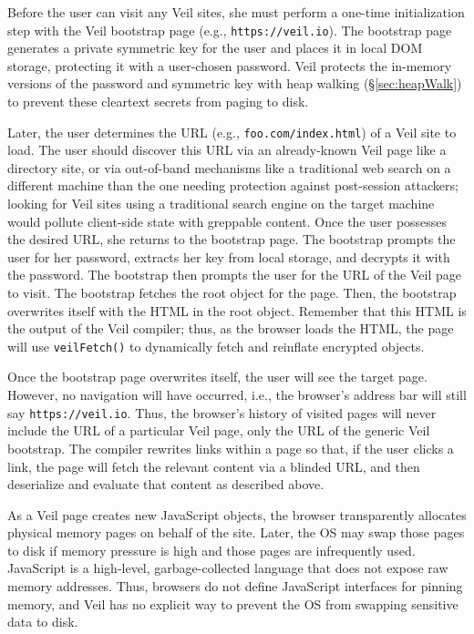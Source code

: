 \label{sec:bootstrap}
Before the user can visit any Veil sites, she
must perform a one-time initialization step
with the Veil bootstrap page (e.g., \texttt{https://veil.io}).
The bootstrap page generates a private symmetric key for
the user and places it in local DOM storage,
protecting it with a user-chosen password. Veil
protects the in-memory versions of the password and
symmetric key with heap walking (\S\ref{sec:heapWalk})
to prevent these cleartext secrets from paging to disk.

Later, the user determines the URL (e.g., \texttt{foo.com/index.html})
of a Veil site to load. The user should discover
this URL via an already-known Veil page like a
directory site, or via out-of-band mechanisms like a
traditional web search on a different machine than the
one needing protection against post-session attackers; looking
for Veil sites using a traditional search engine
on the target machine would pollute client-side state
with greppable content. Once the user possesses the
desired URL, she returns to the bootstrap page. The
bootstrap prompts the user for her password, extracts
her key from local storage, and decrypts it with the
password. The bootstrap then prompts the user for
the URL of the Veil page to visit. The bootstrap
fetches the root object for the page. Then, the
bootstrap overwrites itself with the HTML in the
root object. Remember that this HTML is the output
of the Veil compiler; thus, as the browser loads
the HTML, the page will use \texttt{veilFetch()}
to dynamically fetch and reinflate encrypted objects.

Once the bootstrap page overwrites itself, the user
will see the target page. However, no navigation will
have occurred, i.e., the browser's address bar will
still say \texttt{https://veil.io}. Thus,
the browser's history of visited pages will
never include the URL of a particular Veil page,
only the URL of the generic Veil bootstrap. The
compiler rewrites links within a page so that, if
the user clicks a link, the page will fetch the
relevant content via a blinded URL, and then deserialize
and evaluate that content as described above.

\label{sec:heapWalk}

As a Veil page creates new JavaScript objects,
the browser transparently allocates physical
memory pages on behalf of the site. Later,
the OS may swap those pages to disk if memory
pressure is high and those pages are infrequently
used. JavaScript is a high-level, garbage-collected
language that does not expose raw memory addresses.
Thus, browsers do not define JavaScript interfaces
for pinning memory, and Veil has no explicit way
to prevent the OS from swapping sensitive data
to disk.

